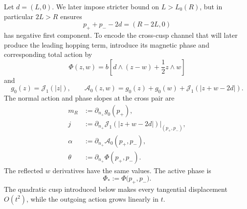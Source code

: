 \documentclass[11pt]{article}
\newcommand{\cA}{\mathcal A}
\newcommand{\cJ}{\mathcal J}
\newcommand{\wedgep}{\mathbin{\wedge}}
\begin{document}
Let $d=(L,0)$.  We later impose stricter bound on $L > L_0(R)$, but in particular $2L>R$ ensures
\[
 p_++p_--2d=(R-2L,0)
\]
has negative first component.
To encode the cross-cusp channel that will later produce the leading hopping term, introduce its magnetic phase and corresponding total action by
\begin{equation}\label{eq:Phi}
 \Phi(z,w)=b\left[d\wedgep(z-w)+\frac12z\wedgep w\right]
\end{equation}
and
\begin{equation}\label{eq:A0-new}
 g_0(z)=\cJ_1(|z|),
 \qquad
 \cA_0(z,w)=g_0(z)+g_0(w)+\cJ_1(|z+w-2d|).
\end{equation} 
The normal action and phase slopes at the cross pair are
\begin{align}
m_R&:=\partial_{n_+}g_0(p_+){,}
\label{eq:mR_0}\\
 j&:=\partial_{n_+}\cJ_1(|z+w-2d|)\big|_{(p_+,p_-)}{,}
      \label{eq:j-new_0}\\
\alpha&:=\partial_{n_+}\cA_0(p_+,p_-){,}
 \label{eq:alpha-new_0}\\
\theta&:=\partial_{n_+}\Phi(p_+,p_-){.}
 \label{eq:theta-new_0}
\end{align}
The reflected $w$ derivatives have the same values.  The active phase is
\begin{equation}\label{eq:Phi-star}
 \Phi_*:=\Phi(p_+,p_-{).}
\end{equation}
The
quadratic cusp introduced below makes every
tangential displacement $O(t^2)$, while the outgoing action grows linearly in
$t$.
\end{document}
